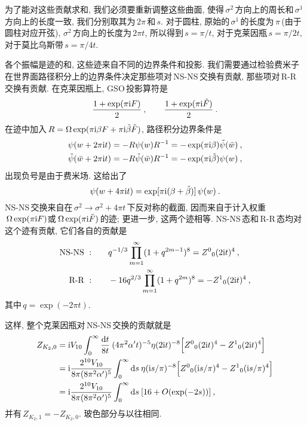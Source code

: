 为了能对这些贡献求和, 我们必须要重新调整这些曲面, 使得$\,\sigma^{2}\,$方向上的周长和$\,\sigma^{1}\,$方向上的长度一致, 我们分别取其为$\,2\pi\,$和$\,s$. 对于圆柱, 原始的$\,\sigma^{1}\,$的长度为$\,\pi\,$(由于圆柱对应开弦), $\sigma^{2}\,$方向上的长度为$\,2\pi t$, 所以得到$\,s=\pi/t$, 对于克莱因瓶$\,s=\pi/2t$, 对于莫比乌斯带$\,s=\pi/4t$. 

各个振幅是迹的和, 这些迹来自不同的边界条件和投影. 我们需要通过检验费米子在世界面路径积分上的边界条件决定那些项对\,NS-NS\,交换有贡献, 那些项对\,R-R\,交换有贡献. 在克莱因瓶上, GSO\,投影算符是
\begin{equation}
    \frac{1+\exp(\pi\mathrm{i} F)}{2} \:,\qquad \frac{1+\exp(\pi\mathrm{i}\tilde{F})}{2} \:. \label{10.8.7}
\end{equation}
在迹中加入$\,R=\Omega \exp(\pi\mathrm{i}\beta F +\pi\mathrm{i}\tilde{\beta}\tilde{F})$, 路径积分边界条件是
\begin{subequations}
    \begin{align}
        \psi(w+2\pi\mathrm{i} t)&= -R\psi(w)R^{-1} =-\exp(\pi\mathrm{i}\beta)\tilde{\psi}(\bar{w}) \:, \label{10.8.8a} \\
        \tilde{\psi}(\bar{w}+2\pi\mathrm{i} t)&= -R\tilde{\psi}(\bar{w})R^{-1} =-\exp(\pi\mathrm{i}\tilde{\beta})\psi(w)\:,\label{10.8.8b}
    \end{align} \label{10.8.8}
\end{subequations}
出现负号是由于费米场. 这给出了
\begin{equation}
    \psi(w+4\pi\mathrm{i} t) = \exp[\pi\mathrm{i}(\beta+\tilde{\beta})]\,\psi(w) \:. \label{10.8.9}
\end{equation}
NS-NS\,交换来自在$\,\sigma^{2}\to\sigma^{2}+4\pi t\,$下反对称的截面, 因而来自于计入权重$\,\Omega\exp(\pi\mathrm{i} F)$或$\,\Omega\exp(\pi\mathrm{i}\tilde{F})\,$的迹; 更进一步, 这两个迹相等. NS-NS\,态和\,R-R\,态均对这个迹有贡献, 它们各自的贡献是
\begin{subequations}
    \begin{align}
        \text{NS-NS }: \qquad &q^{-1/3}\prod_{m=1}^{\infty} (1+q^{2m-1})^{8} = Z^{0}{}_{0}(2\mathrm{i} t)^{4} \:, \label{10.8.10a} \\
        \text{R-R }: \qquad &-16 q^{2/3} \prod_{m=1}^{\infty} (1+q^{2m})^{8} =- Z^{1}{}_{0}(2\mathrm{i} t)^{4} \:,
        \label{10.8.10b}
    \end{align} \label{10.8.10}
\end{subequations}
其中$\,q=\exp(-2\pi t)$.

这样, 整个克莱因瓶对\,NS-NS\,交换的贡献就是
\begin{align}
    Z_{K_{2},0} &= \mathrm{i} V_{10} \int_{0}^{\infty}\frac{\mathrm{d} t}{8t}\: (4\pi^{2}\alpha^{\prime}t)^{-5} \eta(2\mathrm{i} t)^{-8}
    \Bigl[ Z^{0}{}_{0}(2\mathrm{i} t)^{4}-Z^{1}{}_{0}(2\mathrm{i} t)^{4}\Bigr] \nonumber \\
    &= \mathrm{i} \frac{2^{10}V_{10}}{8\pi (8\pi^{2}\alpha^{\prime})^{5}}\int^{\infty}_{0}\mathrm{d} s \: 
    \eta(\mathrm{i} s/\pi)^{-8} \Bigl[ Z^{0}{}_{0}(\mathrm{i} s/\pi)^{4}-Z^{1}{}_{0}(\mathrm{i} s/\pi)^{4} \Bigr] \nonumber \\
    &= \mathrm{i} \frac{2^{10}V_{10}}{8\pi (8\pi^{2}\alpha^{\prime})^{5}}\int^{\infty}_{0}\mathrm{d} s \: 
      [16 + O(\exp(-2s))] \:, \label{10.8.11}
\end{align}
并有$\,Z_{K_{2},1}=-Z_{K_{2},0}$. 玻色部分与以往相同.


